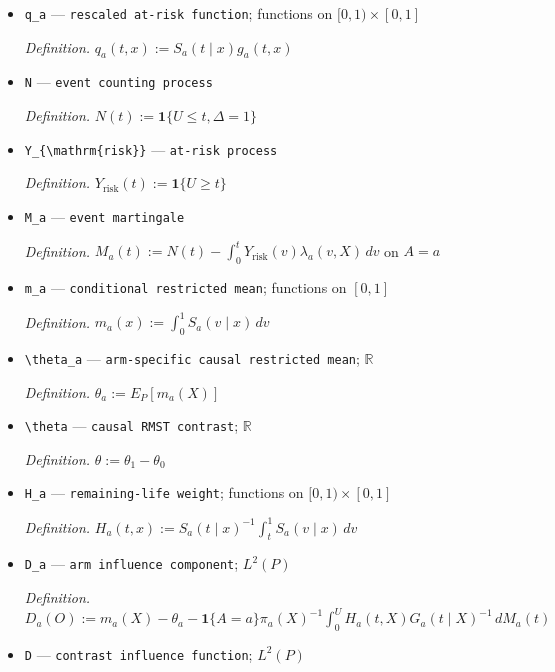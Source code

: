 \documentclass{article}
\begin{document}
\begin{itemize}
  \item \texttt{q\_\allowbreak{}a} --- \texttt{rescaled at-\allowbreak{}risk function}; functions on \([0,1)\times[0,1]\)
  \par\smallskip\noindent\emph{Definition.} \(q_a(t,x):=S_a(t\mid x)g_a(t,x)\)
  \item \texttt{N} --- \texttt{event counting process}
  \par\smallskip\noindent\emph{Definition.} \(N(t):=\mathbf 1\{U\le t,\Delta=1\}\)
  \item \texttt{Y\_\allowbreak{}\{\textbackslash{}\allowbreak{}mathrm\{risk\}\allowbreak{}\}\allowbreak{}} --- \texttt{at-\allowbreak{}risk process}
  \par\smallskip\noindent\emph{Definition.} \(Y_{\mathrm{risk}}(t):=\mathbf 1\{U\ge t\}\)
  \item \texttt{M\_\allowbreak{}a} --- \texttt{event martingale}
  \par\smallskip\noindent\emph{Definition.} \(M_a(t):=N(t)-\int_0^tY_{\mathrm{risk}}(v)\lambda_a(v,X)\,dv\) on \(A=a\)
  \item \texttt{m\_\allowbreak{}a} --- \texttt{conditional restricted mean}; functions on \([0,1]\)
  \par\smallskip\noindent\emph{Definition.} \(m_a(x):=\int_0^1S_a(v\mid x)\,dv\)
  \item \texttt{\textbackslash{}\allowbreak{}theta\_\allowbreak{}a} --- \texttt{arm-\allowbreak{}specific causal restricted mean}; \(\mathbb R\)
  \par\smallskip\noindent\emph{Definition.} \(\theta_a:=E_P[m_a(X)]\)
  \item \texttt{\textbackslash{}\allowbreak{}theta} --- \texttt{causal RMST contrast}; \(\mathbb R\)
  \par\smallskip\noindent\emph{Definition.} \(\theta:=\theta_1-\theta_0\)
  \item \texttt{H\_\allowbreak{}a} --- \texttt{remaining-\allowbreak{}life weight}; functions on \([0,1)\times[0,1]\)
  \par\smallskip\noindent\emph{Definition.} \(H_a(t,x):=S_a(t\mid x)^{-1}\int_t^1S_a(v\mid x)\,dv\)
  \item \texttt{D\_\allowbreak{}a} --- \texttt{arm influence component}; \(L^2(P)\)
  \par\smallskip\noindent\emph{Definition.} \(D_a(O):=m_a(X)-\theta_a-\mathbf 1\{A=a\}\pi_a(X)^{-1}\int_0^U H_a(t,X)G_a(t\mid X)^{-1}\,dM_a(t)\)
  \item \texttt{D} --- \texttt{contrast influence function}; \(L^2(P)\)

\end{itemize}
\end{document}
